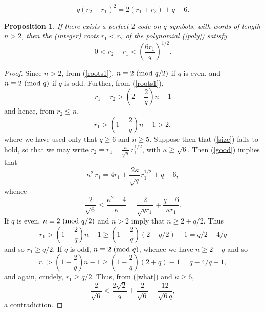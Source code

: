 \documentclass[10pt,a4paper]{amsart}
\newtheorem{prop}{Proposition}
\def\mod#1{{\ifmmode\text{\rm\ (mod~$#1$)}
\else\discretionary{}{}{\hbox{ }}\rm(mod~$#1$)\fi}}
\begin{document}
\begin{equation} \label{good}
q (r_2-r_1)^2 = 2(r_1+r_2) +q-6.
\end{equation}

\begin{prop} \label{Goop}
If there exists a perfect $2$-code on $q$ symbols, with words of length $n>2$, then the (integer) roots $r_1<r_2$ of the polynomial (\ref{poly}) satisfy
\begin{equation} \label{size}
0 < r_2-r_1 < \left( \frac{6r_1}{q} \right)^{1/2}.
\end{equation}
\end{prop}

\begin{proof}
Since $n > 2$,  from (\ref{roots1}),  $n \equiv 2 \mod{q/2}$ if $q$ is even, and  $n \equiv 2 \mod{q}$ if $q$ is odd. Further, from (\ref{roots1}),
$$
r_1+r_2 > \left( 2 -\frac{2}{q} \right) n  -1 
$$
and hence, from $r_2 \leq n$, 
\begin{equation} \label{r1low}
r_1 > \left( 1 -\frac{2}{q} \right) n  -1 > 2,
\end{equation}
where we have used only that $q \geq 6$ and $n \geq 5$. Suppose then that (\ref{size}) fails to hold, so that we may write $r_2=r_1+\frac{\kappa}{\sqrt{q}} \,  r_1^{1/2}$, with $\kappa \geq \sqrt{6}$. Then (\ref{good}) implies that
$$
\kappa^2  \, r_1 = 4 r_1+ \frac{2 \kappa}{\sqrt{q}} r_1^{1/2} +q-6,
$$
whence
\begin{equation} \label{what}
\frac{2}{\sqrt{6}} \leq \frac{\kappa^2-4}{\kappa} = \frac{2}{\sqrt{q r_1}} + \frac{q-6}{\kappa r_1}.
\end{equation}
If $q$ is even, $n \equiv 2 \mod{q/2}$ and $n > 2$ imply that  $n \geq 2+q/2$. Thus
$$
r_1 > \left( 1 -\frac{2}{q} \right) n  -1 \geq 
\left( 1 -\frac{2}{q} \right) (2+q/2)-1 =q/2-4/q
$$
and so $r_1 \geq q/2$. If $q$ is odd, $n \equiv 2 \mod{q}$, whence
we have $n \geq 2+q$ and so 
$$
r_1 > \left( 1 -\frac{2}{q} \right) n  -1 \geq 
\left( 1 -\frac{2}{q} \right) (2+q)-1 =q-4/q-1,
$$
and again, crudely, $r_1 \geq q/2$. Thus, from (\ref{what}) and $\kappa \geq 6$, 
$$
\frac{2}{\sqrt{6}}  
< \frac{2\sqrt{2}}{q} + \frac{2}{\sqrt{6}}  -\frac{12}{\sqrt{6} q},
$$
a contradiction.
\end{proof}
\end{document}
